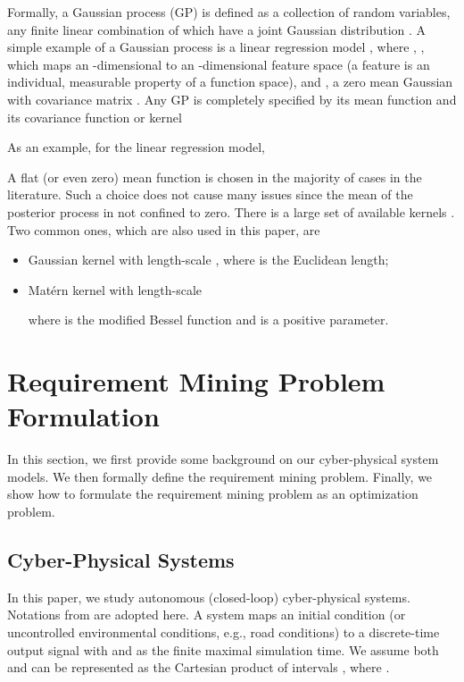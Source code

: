 \documentclass[10pt]{article}
\theoremstyle{plain}
\begin{document}
Formally, a Gaussian process (GP) is defined as a collection of random variables, any finite linear combination of which have a joint Gaussian distribution \cite{Rasmussen2006}. A simple example of a Gaussian process is a linear regression model , where , , which maps an -dimensional  to an -dimensional feature space (a feature is an individual, measurable property of a function space), and , a zero mean Gaussian with covariance matrix . Any GP is completely specified by its mean function  and its covariance function or kernel 

As an example, for the linear regression model,




A flat (or even zero) mean function  is chosen in the majority of cases in the literature. Such a choice does not cause many issues since the mean of the posterior process in not confined to zero. There is a large set of available kernels . Two common ones, which are also used in this paper, are \cite{Anwar2015}
\begin{itemize}
\item Gaussian kernel with length-scale , where  is the Euclidean length;
\item Mat\'{e}rn kernel with length-scale  

where  is the modified Bessel function and  is a positive parameter.
\end{itemize}



\section{Requirement Mining Problem Formulation}
\label{problemForm}


In this section, we first provide some background on our cyber-physical system models. We then formally define the requirement mining problem. Finally, we show how to formulate the requirement mining problem as an optimization problem. 




\subsection{Cyber-Physical Systems}
\label{sec:system}

In this paper, we study autonomous (closed-loop) cyber-physical systems. Notations from \cite{abbas2013probabilistic,sankaranarayanan2012falsification} are adopted here. A system  maps an initial condition (or uncontrolled environmental conditions, e.g., road conditions)  to a discrete-time output signal  with  and  as the finite maximal simulation time. We assume both  and  can be represented as the Cartesian product of intervals , where . 
\end{document}
